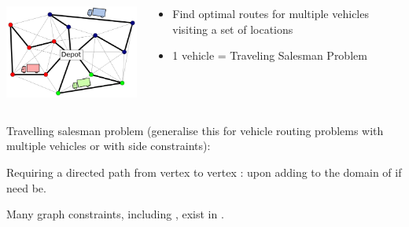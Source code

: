 \documentclass{cons-beamer}
\begin{document}
\begin{flashcardminizinc}
\begin{frame}
  \begin{example}

    \begin{columns}
      \begin{column}{0.4\textwidth}        
        \includegraphics[width=60mm]{images/VRP.png} \\
      \end{column}
      \begin{column}{0.6\textwidth}        
        \begin{itemize}
          \item Find optimal routes for multiple vehicles visiting a set of locations
          \item 1 vehicle = Traveling Salesman Problem
        \end{itemize}
      \end{column}
    \end{columns}

    Travelling salesman problem (generalise this for vehicle
    routing problems with multiple vehicles or with side constraints):

    \vspace{-2mm}
    
    \vspace{-2mm}
    
    Requiring a \alert{directed path} from vertex  to
    vertex : 
    upon adding  to the domain of  if
    need be.
  \end{example}
  \vspace{-1mm}

  Many graph constraints, including , exist in
  \MiniZinc.
\end{frame}
\end{flashcardminizinc}
\end{document}
